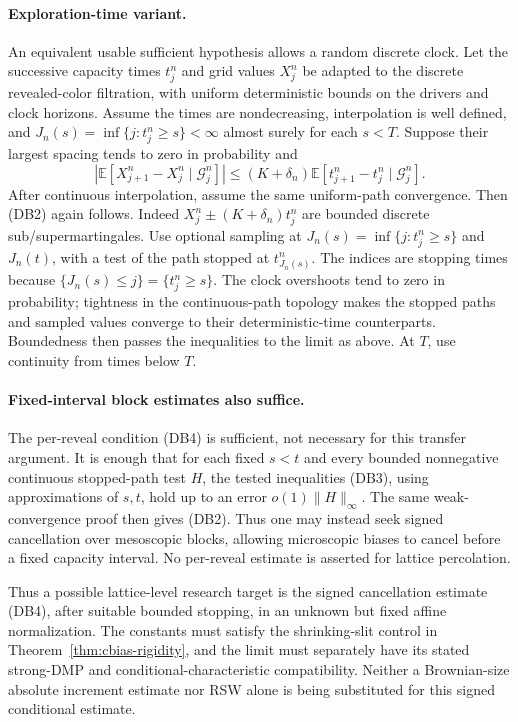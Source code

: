 \documentclass[11pt]{article}
\theoremstyle{definition}\newtheorem{definition}[theorem]{Definition}
\theoremstyle{remark}\newtheorem{remark}[theorem]{Remark}
\begin{document}
\paragraph{Exploration-time variant.}
An equivalent usable sufficient hypothesis allows a random discrete
clock. Let the successive capacity times $t^n_j$ and grid values
$X^n_j$ be adapted to the discrete revealed-color filtration, with
uniform deterministic bounds on the drivers and clock horizons. Assume
the times are nondecreasing, interpolation is well defined, and
$J_n(s)=\inf\{j:t^n_j\ge s\}<\infty$ almost surely for each $s<T$.
Suppose their largest spacing tends to zero in probability and
\[
 \left|\mathbb E[X^n_{j+1}-X^n_j\mid\mathcal G^n_j]\right|
 \le (K+\delta_n)
       \mathbb E[t^n_{j+1}-t^n_j\mid\mathcal G^n_j].
 \tag{DB4}
\]
After continuous interpolation, assume the same uniform-path convergence.
Then (DB2) again follows. Indeed $X^n_j\pm(K+\delta_n)t^n_j$
are bounded discrete sub/supermartingales. Use optional sampling at
$J_n(s)=\inf\{j:t^n_j\ge s\}$ and $J_n(t)$, with a test
of the path stopped at $t^n_{J_n(s)}$. The indices are stopping times
because $\{J_n(s)\le j\}=\{t^n_j\ge s\}$.
The clock overshoots tend to zero in probability; tightness in the
continuous-path topology makes the stopped paths and sampled values
converge to their deterministic-time counterparts. Boundedness then
passes the inequalities to the limit as above. At $T$, use continuity
from times below $T$.

\paragraph{Fixed-interval block estimates also suffice.}
The per-reveal condition (DB4) is sufficient, not necessary for this
transfer argument. It is enough that for each fixed $s<t$ and every
bounded nonnegative continuous stopped-path test $H$, the tested
inequalities (DB3), using approximations of $s,t$, hold up to an error
$o(1)\|H\|_\infty$. The same weak-convergence proof then gives
(DB2). Thus one may instead seek signed cancellation over mesoscopic
blocks, allowing microscopic biases to cancel before a fixed capacity
interval. No per-reveal estimate is asserted for lattice percolation.

Thus a possible lattice-level research target is the signed cancellation
estimate (DB4), after suitable bounded stopping, in an unknown but fixed
affine normalization. The constants must satisfy the shrinking-slit
control in Theorem~\ref{thm:cbias-rigidity}, and the limit must separately
have its stated strong-DMP and conditional-characteristic compatibility.
Neither a Brownian-size absolute increment estimate nor RSW alone is
being substituted for this signed conditional estimate.
\end{document}
